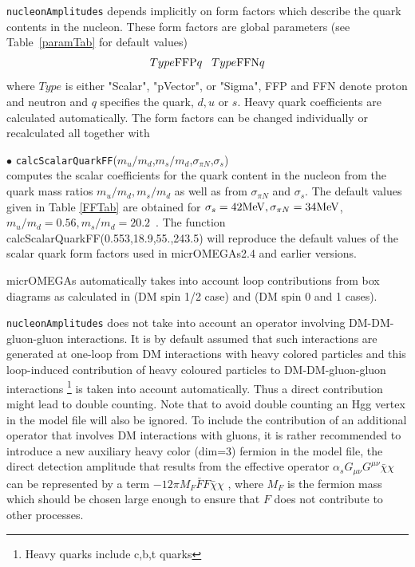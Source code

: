 \documentclass[12pt,a4paper]{article}
\begin{document}
\verb|nucleonAmplitudes| depends implicitly on form factors which describe the 
quark contents in the nucleon. These form factors are global parameters (see
Table~\ref{paramTab} for
default values)
\begin{equation}
Type{\rm FFP}q \;\;\; Type{\rm FFN}q \nonumber
\end{equation} 
where $Type$ is either "Scalar", "pVector", or "Sigma",  FFP and FFN denote proton and neutron  and
$q$ specifies the quark, $d,u$  or $s$. Heavy quark coefficients are calculated automatically. The form factors can be changed individually or recalculated all together with 

\noindent$\bullet$
{\tt calcScalarQuarkFF}($m_u/m_d$,$m_s/m_d$,$\sigma_{\pi N}$,$\sigma_s$)\\
computes the scalar coefficients for the quark content in the nucleon from the quark mass ratios
$m_u/m_d, m_s/m_d$ as well as from $\sigma_{\pi N}$ and $\sigma_s$.
The default values given in Table  \ref{FFTab} are obtained for 
$\sigma_s=42{\rm MeV},\sigma_{\pi N}=34{\rm MeV}$, $m_u/m_d=0.56, m_s/m_d=20.2$~\cite{Beringer:1900zz}.
The function calcScalarQuarkFF(0.553,18.9,55.,243.5)  will reproduce   the default values of the  scalar quark
form factors used in micrOMEGAs2.4 and earlier  versions.

micrOMEGAs automatically takes into account loop contributions  from box
diagrams as calculated in \cite{Drees:1993bu} (DM spin 1/2 case) and \cite{Hisano:2015bma}
(DM spin 0 and 1 cases).

\verb|nucleonAmplitudes| 
 does not take into account an operator involving DM-DM-gluon-gluon   interactions. It is by default assumed that such interactions
are generated at one-loop from DM interactions with heavy colored particles and  this loop-induced contribution of heavy coloured particles  to DM-DM-gluon-gluon  interactions \footnote{Heavy quarks  include c,b,t quarks}  is taken into account automatically.  Thus a direct contribution might lead to double counting. Note that to avoid double counting an Hgg vertex in the model file will also be ignored. 
To include the contribution of an additional operator that involves DM interactions with gluons, it is rather recommended to introduce a new 
auxiliary heavy color (dim=3) fermion in the model file,  the direct detection amplitude that results from the effective operator 
 $\alpha_s G_{\mu\nu}G^{\mu\nu} \bar{\chi}\chi$  can be  represented by a term   $-12 \pi  M_F \bar{F} F \bar{\chi}\chi$  ,
where $M_F$  is the fermion mass  which should be chosen large enough to ensure that
$F$ does not contribute to other processes. 
\end{document}
